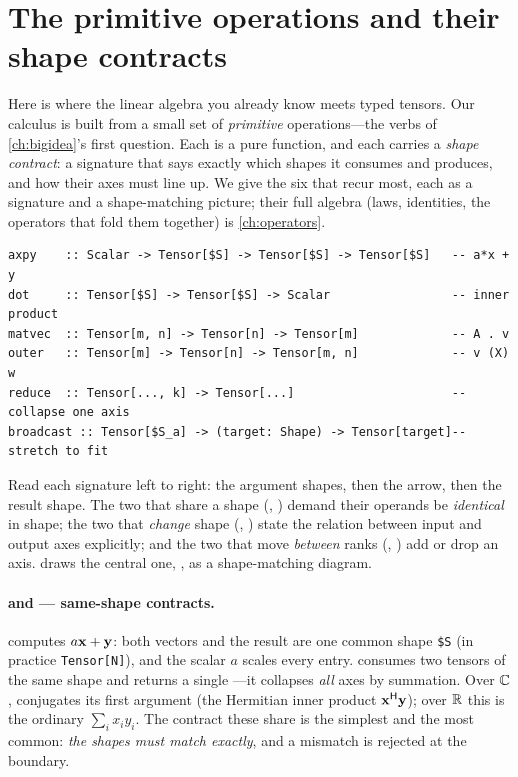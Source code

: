 \section{The primitive operations and their shape contracts}
\label{sec:t-primitives}

Here is where the linear algebra you already know meets typed tensors. Our
calculus is built from a small set of \emph{primitive} operations---the verbs of
\cref{ch:bigidea}'s first question. Each is a pure function, and each carries a
\emph{shape contract}: a signature that says exactly which shapes it consumes and
produces, and how their axes must line up. We give the six that recur most, each
as a signature and a shape-matching picture; their full algebra (laws, identities,
the operators that fold them together) is \cref{ch:operators}.

\begin{lstlisting}[style=l4style]
axpy    :: Scalar -> Tensor[$S] -> Tensor[$S] -> Tensor[$S]   -- a*x + y
dot     :: Tensor[$S] -> Tensor[$S] -> Scalar                 -- inner product
matvec  :: Tensor[m, n] -> Tensor[n] -> Tensor[m]             -- A . v
outer   :: Tensor[m] -> Tensor[n] -> Tensor[m, n]             -- v (X) w
reduce  :: Tensor[..., k] -> Tensor[...]                      -- collapse one axis
broadcast :: Tensor[$S_a] -> (target: Shape) -> Tensor[target]-- stretch to fit
\end{lstlisting}

\noindent Read each signature left to right: the argument shapes, then the
arrow, then the result shape. The two that share a shape (,
) demand their operands be \emph{identical} in shape; the two that
\emph{change} shape (, ) state the relation between input
and output axes explicitly; and the two that move \emph{between} ranks
(, ) add or drop an axis. 
draws the central one, , as a shape-matching diagram.

\paragraph{ and  --- same-shape contracts.}
 computes $a\mathbf{x}+\mathbf{y}$: both vectors and the result are one common shape
\lstinline[style=l4style]|$S| (in practice \lstinline[style=l4style]|Tensor[N]|),
and the scalar $a$ scales every entry.  consumes two tensors of the
same shape and returns a single ---it collapses \emph{all} axes by
summation. Over $\mathbb{C}$,  conjugates its first argument (the
Hermitian inner product $\mathbf{x}^{\mathsf H}\mathbf{y}$); over $\mathbb{R}$ this is the ordinary
$\sum_i x_i y_i$. The contract these share is the simplest and the most common:
\emph{the shapes must match exactly}, and a mismatch is rejected at the boundary.

